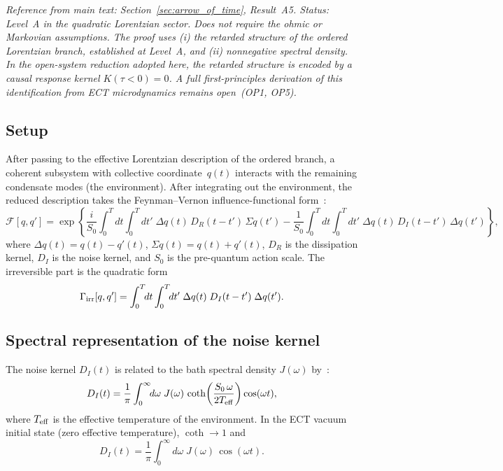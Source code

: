 \documentclass[11pt,a4paper]{article}
\numberwithin{equation}{section}
\begin{document}
\textit{Reference from main text: Section~\ref{sec:arrow_of_time},
Result~A5.
Status: Level~A in the quadratic Lorentzian sector.
Does not require the ohmic or Markovian assumptions.
The proof uses (i) the retarded structure of the ordered Lorentzian
branch, established at Level~A, and (ii) nonnegative spectral density.
In the open-system reduction adopted here, the retarded structure is
encoded by a causal response kernel $K(\tau<0)=0$.
A full first-principles derivation of this identification from ECT
microdynamics remains open~(OP1, OP5).}

\subsection*{Setup}

After passing to the effective Lorentzian description of the ordered
branch, a coherent subsystem with collective coordinate~$q(t)$
interacts with the remaining condensate modes (the environment).
After integrating out the environment, the reduced description takes
the Feynman--Vernon influence-functional
form~\cite{FeynmanVernon1963,CaldeiraLeggett1983}:
\begin{equation}
  \mathcal{F}[q,q']
  = \exp\!\left\{
    \frac{i}{S_0}\int_0^T\!\!dt\int_0^T\!\!dt'\;
    \Delta q(t)\,D_R(t-t')\,\Sigma q(t')
    - \frac{1}{S_0}\int_0^T\!\!dt\int_0^T\!\!dt'\;
    \Delta q(t)\,D_I(t-t')\,\Delta q(t')
  \right\},
  \label{eq:FV_form}
\end{equation}
where $\Delta q(t) = q(t)-q'(t)$, $\Sigma q(t) = q(t)+q'(t)$,
$D_R$ is the dissipation kernel, $D_I$ is the noise kernel,
and $S_0$ is the pre-quantum action scale.
The irreversible part is the quadratic form
\begin{equation}
  \Gamma_{\rm irr}[q,q']
  = \int_0^T\!\!dt\int_0^T\!\!dt'\;
    \Delta q(t)\;D_I(t-t')\;\Delta q(t').
  \label{eq:Gamma_irr_def}
\end{equation}

\subsection*{Spectral representation of the noise kernel}

The noise kernel $D_I(t)$ is related to the bath spectral density
$J(\omega)$ by~\cite{CaldeiraLeggett1983}:
\begin{equation}
  D_I(t) = \frac{1}{\pi}\int_0^\infty\!\!d\omega\;
  J(\omega)\,\coth\!\left(\frac{S_0\,\omega}{2T_{\rm eff}}\right)
  \cos(\omega t),
  \label{eq:DI_spectral}
\end{equation}
where $T_{\rm eff}$ is the effective temperature of the environment.
In the ECT vacuum initial state (zero effective temperature),
$\coth\to 1$ and
\begin{equation}
  D_I(t) = \frac{1}{\pi}\int_0^\infty\!\!d\omega\;
  J(\omega)\,\cos(\omega t).
  \label{eq:DI_vacuum}
\end{equation}
\end{document}
